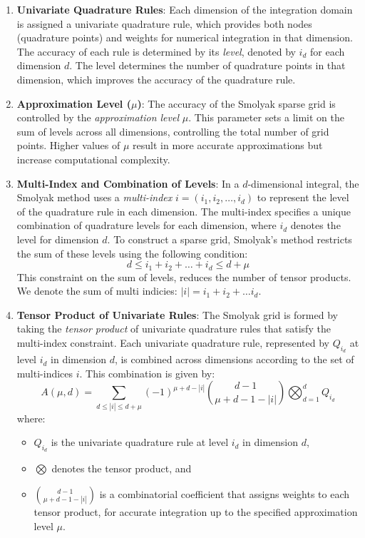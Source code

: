 \documentclass[11pt]{article}
\begin{document}
\begin{enumerate}
  \item \textbf{Univariate Quadrature Rules}: Each dimension of the integration domain is assigned a univariate quadrature rule, which provides both nodes (quadrature points) and weights for numerical integration in that dimension. The accuracy of each rule is determined by its \textit{level}, denoted by \( i_d \) for each dimension \( d \). The level determines the number of quadrature points in that dimension, which improves the accuracy of the quadrature rule. 
  
  \item \textbf{Approximation Level (\( \mu \))}: The accuracy of the Smolyak sparse grid is controlled by the \textit{approximation level} \( \mu \). This parameter sets a limit on the sum of levels across all dimensions, controlling the total number of grid points. Higher values of \( \mu \) result in more accurate approximations but increase computational complexity.

  \item \textbf{Multi-Index and Combination of Levels}: In a \( d \)-dimensional integral, the Smolyak method uses a \textit{multi-index} \( i = (i_1, i_2, \dots, i_d) \) to represent the level of the quadrature rule in each dimension. The multi-index specifies a unique combination of quadrature levels for each dimension, where \( i_d \) denotes the level for dimension \( d \). To construct a sparse grid, Smolyak’s method restricts the sum of these levels using the following condition:
  \[
  d \leq i_1 + i_2 + \dots + i_d \leq d +  \mu
  \]
  This constraint on the sum of levels, reduces the number of tensor products. We denote the sum of multi indicies: $\lvert i \rvert = i_1 + i_2 + \dots i_d$.

  \item \textbf{Tensor Product of Univariate Rules}: The Smolyak grid is formed by taking the \textit{tensor product} of univariate quadrature rules that satisfy the multi-index constraint. Each univariate quadrature rule, represented by \( Q_{i_d} \) at level \( i_d \) in dimension \( d \), is combined across dimensions according to the set of multi-indices \( i \). This combination is given by:
  \[
  A(\mu, d) = \sum_{d \leq |i| \leq d + \mu} (-1)^{\mu + d - |i|} \binom{d - 1}{\mu + d - 1 - |i|} \bigotimes_{d=1}^d Q_{i_d}
  \]
  where:
  \begin{itemize}
      \item \( Q_{i_d} \) is the univariate quadrature rule at level \( i_d \) in dimension \( d \),
      \item \( \bigotimes \) denotes the tensor product, and
      \item \( \binom{d - 1}{\mu + d - 1 - |i|} \) is a combinatorial coefficient that assigns weights to each tensor product, for accurate integration up to the specified approximation level \( \mu \).
  \end{itemize} 
\end{enumerate}
\end{document}
